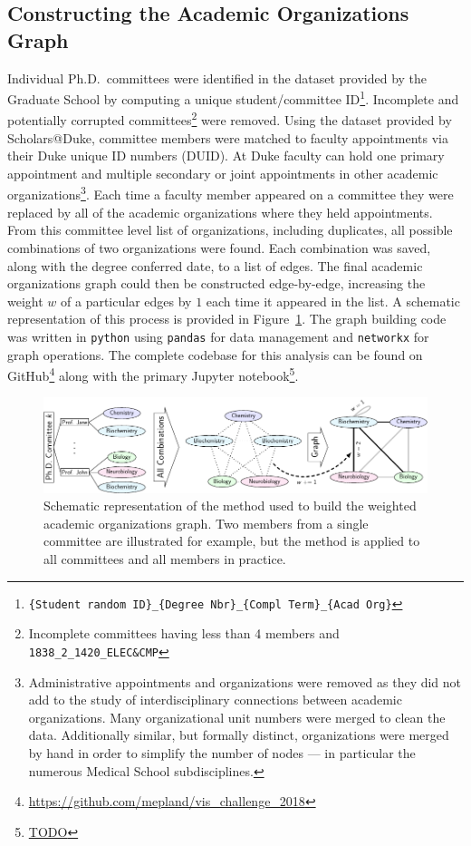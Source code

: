 \documentclass[notitlepage,aps,prd,nofootinbib]{revtex4-1}
\begin{document}
\subsection{Constructing the Academic Organizations Graph}
\label{sec:construct_graph}
Individual Ph.D.\ committees were identified in the  dataset provided by the Graduate School by computing a unique student/committee ID\footnote{\texttt{\{Student random ID\}\_\{Degree Nbr\}\_\{Compl Term\}\_\{Acad Org\}}}. Incomplete and potentially corrupted committees\footnote{Incomplete committees having less than 4 members and \texttt{1838\_2\_1420\_ELEC\&CMP}} were removed. Using the  dataset provided by Scholars@Duke, committee members were matched to faculty appointments via their Duke unique ID numbers (DUID). At Duke faculty can hold one primary appointment and multiple secondary or joint appointments in other academic organizations\footnote{Administrative appointments and organizations were removed as they did not add to the study of interdisciplinary connections between academic organizations. Many organizational unit numbers were merged to clean the data. Additionally similar, but formally distinct, organizations were merged by hand in order to simplify the number of nodes --- in particular the numerous Medical School subdisciplines.}. Each time a faculty member appeared on a committee they were replaced by all of the academic organizations where they held appointments. From this committee level list of organizations, including duplicates, all possible combinations of two organizations were found. Each combination was saved, along with the degree conferred date, to a list of edges. The final academic organizations graph could then be constructed edge-by-edge, increasing the weight $w$ of a particular edges by $1$ each time it appeared in the list. A schematic representation of this process is provided in Figure~\ref{fig:method_schematic}. The graph building code was written in \texttt{python} using \texttt{pandas} \cite{pandas} for data management and \texttt{networkx} \cite{networkx} for graph operations. The complete codebase for this analysis can be found on GitHub\footnote{\url{https://github.com/mepland/vis_challenge_2018}} along with the primary Jupyter notebook\footnote{\url{TODO}}.

\begin{figure}[!htb]\centering
  \includegraphics[width=\textwidth]{../poster/tikzout/vis_challenge_2018_poster-matthew_epland-figure0.pdf}
  \caption{Schematic representation of the method used to build the weighted academic organizations graph. Two members from a single committee are illustrated for example, but the method is applied to all committees and all members in practice.}
  \label{fig:method_schematic}
\end{figure}
\end{document}
